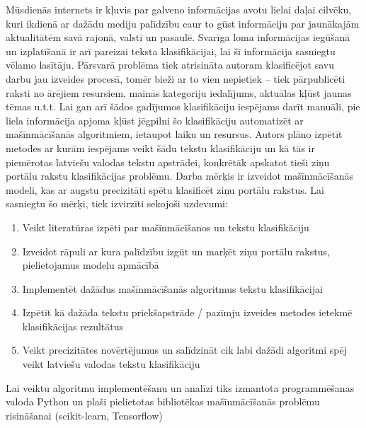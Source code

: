 Mūsdienās internets ir kļuvis par galveno informācijas avotu lielai daļai cilvēku, kuri ikdienā ar dažādu mediju palīdzību caur to gūst informāciju par jaunākajām aktualitātēm savā rajonā, valstī un pasaulē. Svarīga loma informācijas iegūšanā un izplatīšanā ir arī pareizai teksta klasifikācijai, lai šī informācija sasniegtu vēlamo lasītāju. Pārsvarā problēma tiek atrisināta autoram klasificējot savu darbu jau izveides procesā, tomēr bieži ar to vien nepietiek – tiek pārpublicēti raksti no ārējiem resursiem, mainās kategoriju iedalījums, aktuālas kļūst jaunas tēmas u.t.t. Lai gan arī šādos gadījumos klasifikāciju iespējams darīt manuāli, pie liela informācija apjoma kļūst jēgpilni šo klasifikāciju automatizēt ar mašīnmācīšanās algoritmiem, ietaupot laiku un resursus. Autors plāno izpētīt metodes ar kurām iespējams veikt šādu tekstu klasifikāciju un kā tās ir piemērotas latviešu valodas tekstu apstrādei, konkrētāk apskatot tieši ziņu portālu rakstu klasifikācijas problēmu. Darba mērķis ir izveidot mašīnmācīšanās modeli, kas ar augstu precizitāti spētu klasificēt ziņu portālu rakstus. Lai sasniegtu šo mērķi, tiek izvirzīti sekojoši uzdevumi:
\begin{enumerate}
\item Veikt literatūras izpēti par mašīnmācīšanos un tekstu klasifikāciju
\item Izveidot rāpuli ar kura palīdzību izgūt un marķēt ziņu portālu rakstus, pielietojamus modeļu apmācībā
\item Implementēt dažādus mašīnmācīšanās algoritmus tekstu klasifikācijai
\item Izpētīt kā dažāda tekstu priekšapstrāde / pazīmju izveides metodes ietekmē klasifikācijas rezultātus
\item Veikt precizitātes novērtējumus un salīdzināt cik labi dažādi algoritmi spēj veikt latviešu valodas tekstu klasifikāciju
\end{enumerate}

Lai veiktu algoritmu implementēšanu un analīzi tiks izmantota programmēšanas valoda Python un plaši pielietotas bibliotēkas mašīnmācīšanās problēmu risināšanai (scikit-learn, Tensorflow)